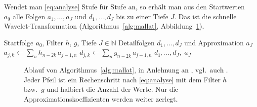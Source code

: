 \documentclass[a4paper,11pt,bibliography=totoc,listof=totoc,headinclude=true,cleardoublepage=empty,oneside]{scrbook}
\theoremstyle{plain}
\theoremstyle{definition}
\newcommand{\N}{\mathbb{N}}
\begin{document}
Wendet man \eqref{eq:analyse} Stufe für Stufe an, so erhält man aus den
Startwerten $a_0$ alle Folgen $a_1,\dots,a_J$ und $d_1,\dots,d_J$ bis zu einer
Tiefe $J$. Das ist die schnelle Wavelet-Transformation
(Algorithmus~\ref{alg:mallat}, Abbildung~\ref{fig:mallat-schema}).

\begin{algorithm}[H]
\caption[Schnelle Wavelet-Transformation]{Schnelle Wavelet-Transformation,
vgl.\ \cite[Kap.~5.4]{blatter}, \cite[Kap.~2.3, Abb.~2.8]{lmr}}
\label{alg:mallat}
\algrenewcommand{}
\algrenewcommand\algorithmicdo{}
\algrenewcommand{}
\algrenewcommand{}
\algrenewcommand{}
\begin{algorithmic}[1]
\Require Startfolge $a_0$, Filter $h$, $g$, Tiefe $J\in\N$
\Ensure Detailfolgen $d_1,\dots,d_J$ und Approximation $a_J$
    \State $a_{j,k} \gets \sum_{n} h_{n-2k}\,a_{j-1,n}$
    \State $d_{j,k} \gets \sum_{n} g_{n-2k}\,a_{j-1,n}$
  \EndFor
\EndFor
\State \Return $d_1,\dots,d_J,\;a_J$
\end{algorithmic}
\end{algorithm}

\begin{figure}[htbp]
  \centering
  \caption[Schema des Mallat-Algorithmus]{Ablauf von
  Algorithmus~\ref{alg:mallat}, in Anlehnung an \cite[Kap.~5.4, (6)]{blatter}, %
  vgl.\ auch \cite[Abb.~2.8]{lmr}. Jeder %
  Pfeil ist ein Rechenschritt nach \eqref{eq:analyse} mit dem Filter $h$ bzw.\
  $g$ und halbiert die Anzahl der Werte. Nur die Approximationskoeffizienten
  werden weiter zerlegt.}
  \label{fig:mallat-schema}
\end{figure}
\end{document}
